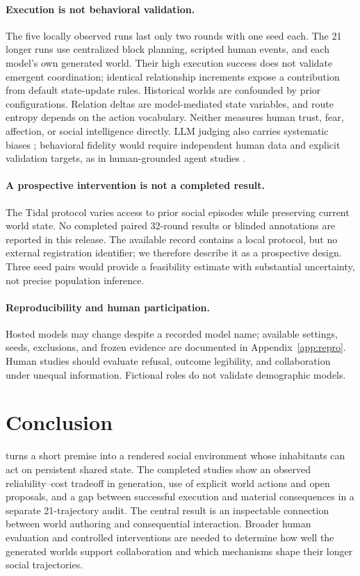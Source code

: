 \paragraph{Execution is not behavioral validation.}
The five locally observed runs last only two rounds with one seed each. The
21 longer runs use centralized block planning, scripted human events, and each
model's own generated world. Their high execution success does not validate
emergent coordination; identical relationship increments expose a contribution
from default state-update rules. Historical worlds
are confounded by prior configurations. Relation deltas are model-mediated
state variables, and route entropy depends on the action vocabulary.
Neither measures human trust, fear, affection, or social intelligence directly.
LLM judging also carries systematic biases \cite{judge}; behavioral fidelity
would require independent human data and explicit validation targets, as in
human-grounded agent studies \cite{park1000}.

\paragraph{A prospective intervention is not a completed result.}
The Tidal protocol varies access to prior social episodes while preserving
current world state. No completed paired 32-round results or blinded annotations
are reported in this release. The available record contains a local protocol,
but no external registration identifier; we therefore describe it as a
prospective design. Three seed pairs would provide a feasibility estimate with
substantial uncertainty, not precise population inference.

\paragraph{Reproducibility and human participation.}
Hosted models may change despite a recorded model name; available settings,
seeds, exclusions, and frozen evidence are documented in Appendix~\ref{app:repro}.
Human studies should evaluate refusal, outcome legibility, and collaboration
under unequal information. Fictional roles do not validate demographic models.

\section{Conclusion}
\agora turns a short premise into a rendered social environment whose
inhabitants can act on persistent shared state. The completed studies show
an observed reliability--cost tradeoff in generation, use of explicit
world actions and open proposals, and a gap between successful execution and
material consequences in a separate 21-trajectory audit.
The central result is an inspectable connection between world authoring and
consequential interaction. Broader human evaluation and controlled
interventions are needed to determine how well the generated worlds support
collaboration and which mechanisms shape their longer social trajectories.
